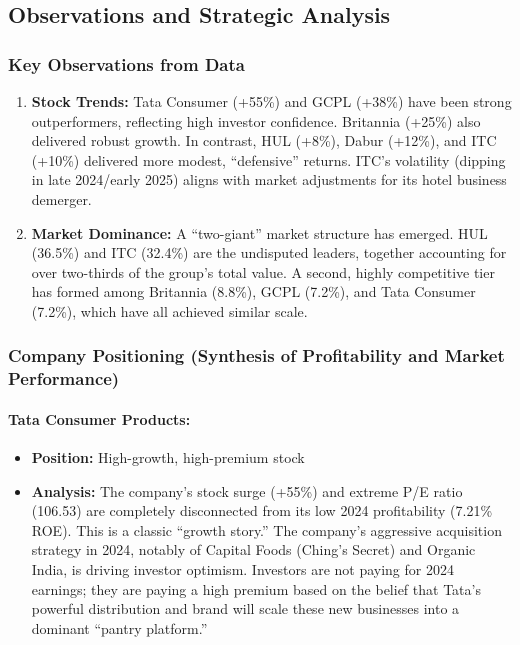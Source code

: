 \documentclass[12pt, a4paper]{report}
\begin{document}
\vspace{0.3cm}

\subsection{Observations and Strategic Analysis}

\subsubsection*{Key Observations from Data}

\begin{enumerate}
    \item \textbf{Stock Trends:} Tata Consumer (+55\%) and GCPL (+38\%) have been strong outperformers, reflecting high investor confidence. Britannia (+25\%) also delivered robust growth. In contrast, HUL (+8\%), Dabur (+12\%), and ITC (+10\%) delivered more modest, ``defensive'' returns. ITC's volatility (dipping in late 2024/early 2025) aligns with market adjustments for its hotel business demerger.
    
    \item \textbf{Market Dominance:} A ``two-giant'' market structure has emerged. HUL (36.5\%) and ITC (32.4\%) are the undisputed leaders, together accounting for over two-thirds of the group's total value. A second, highly competitive tier has formed among Britannia (8.8\%), GCPL (7.2\%), and Tata Consumer (7.2\%), which have all achieved similar scale.
\end{enumerate}

\subsubsection*{Company Positioning (Synthesis of Profitability and Market Performance)}

\paragraph{Tata Consumer Products:}
\begin{itemize}
    \item \textbf{Position:} High-growth, high-premium stock
    \item \textbf{Analysis:} The company's stock surge (+55\%) and extreme P/E ratio (106.53) are completely disconnected from its low 2024 profitability (7.21\% ROE). This is a classic ``growth story.'' The company's aggressive acquisition strategy in 2024, notably of Capital Foods (Ching's Secret) and Organic India, is driving investor optimism. Investors are not paying for 2024 earnings; they are paying a high premium based on the belief that Tata's powerful distribution and brand will scale these new businesses into a dominant ``pantry platform.''
\end{itemize}
\end{document}
